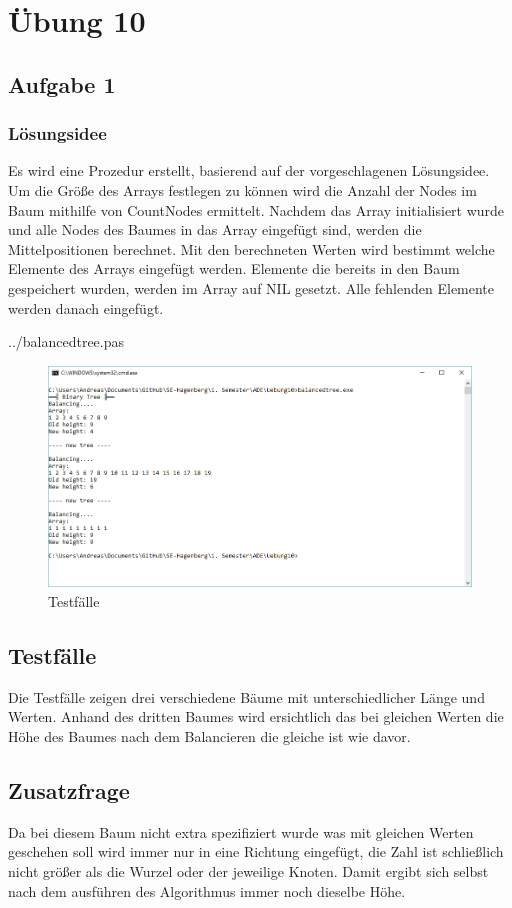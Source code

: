 \section*{Übung 10}
\subsection*{Aufgabe 1}
\subsubsection*{Lösungsidee}
Es wird eine Prozedur erstellt, basierend auf der vorgeschlagenen Lösungsidee. Um die Größe des Arrays festlegen zu können wird die Anzahl der Nodes im Baum mithilfe von CountNodes ermittelt. Nachdem das Array initialisiert wurde und alle Nodes des Baumes in das Array eingefügt sind, werden die Mittelpositionen berechnet. Mit den berechneten Werten wird bestimmt welche Elemente des Arrays eingefügt werden. Elemente die bereits in den Baum gespeichert wurden, werden im Array auf NIL gesetzt. Alle fehlenden Elemente werden danach eingefügt.
\newline

 {../balancedtree.pas}
\begin{figure}[H]
	\centering
	\includegraphics[scale=0.65]{./pictures/balancedtree.png}
	\caption{Testfälle}
	\label{fig: BalancedTree}
\end{figure}

\subsection*{Testfälle}
Die Testfälle zeigen drei verschiedene Bäume mit unterschiedlicher Länge und Werten. Anhand des dritten Baumes wird ersichtlich das bei gleichen Werten die Höhe des Baumes nach dem Balancieren die gleiche ist wie davor.

\subsection*{Zusatzfrage}
Da bei diesem Baum nicht extra spezifiziert wurde was mit gleichen Werten geschehen soll wird immer nur in eine Richtung eingefügt, die Zahl ist schließlich nicht größer als die Wurzel oder der jeweilige Knoten. Damit ergibt sich selbst nach dem ausführen des Algorithmus immer noch dieselbe Höhe.
\newpage




